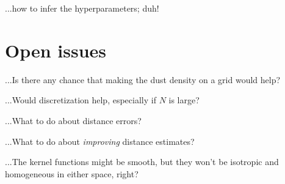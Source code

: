 \documentclass[12pt, letterpaper]{article}
\begin{document}
...how to infer the hyperparameters; duh!

\section{Open issues}

...Is there any chance that making the dust density on a grid would help?

...Would discretization help, especially if $N$ is large?

...What to do about distance errors?

...What to do about \emph{improving} distance estimates?

...The kernel functions might be smooth, but they won't be isotropic and homogeneous in either space, right?
\end{document}
